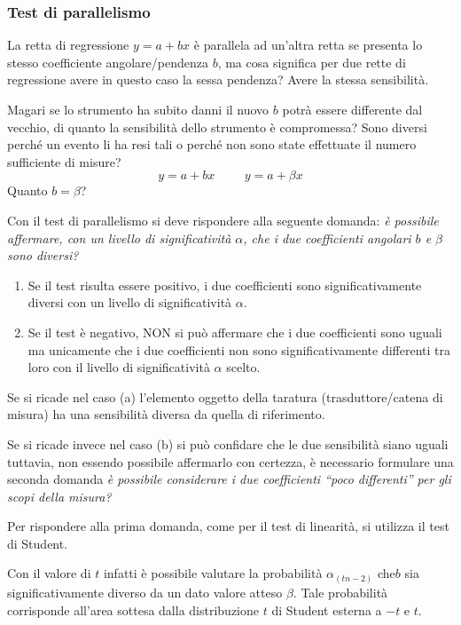 \documentclass[a4paper, 15pt]{article}
\begin{document}
\subsubsection{Test di parallelismo}
\begin{adjustwidth}{2in}{}		
	La retta di regressione $y = a +bx$ è parallela ad un'altra retta se presenta lo stesso coefficiente angolare/pendenza $b$, ma cosa significa per due rette di regressione avere in questo caso la sessa pendenza? Avere la stessa sensibilità.\newline  
	
	Magari se lo strumento ha subito danni il nuovo $b$ potrà essere differente dal vecchio, di quanto la sensibilità dello strumento è compromessa? Sono diversi perché un evento li ha resi tali o perché non sono state effettuate il numero sufficiente di misure? 	
	\[ y = a + bx \hspace{1cm} y = a + \beta x\]
	Quanto $b=\beta$?\newline 
	
	Con il test di parallelismo si deve rispondere alla seguente domanda:\textit{ è possibile affermare, con un livello di significatività $\alpha$, che i due coefficienti angolari
	$ b $ e $\beta$ sono diversi?}
	\begin{enumerate}[label=(\alph*)]
		\item Se il test risulta essere positivo, i due coefficienti sono significativamente
		diversi con un livello di significatività $\alpha$.
		\item Se il test è negativo, NON si può affermare che i due coefficienti sono uguali
		ma unicamente che i due coefficienti non sono significativamente differenti tra
		loro con il livello di significatività $\alpha$ scelto.
	\end{enumerate}
	Se si ricade nel caso (a) l’elemento oggetto della taratura (trasduttore/catena di misura) ha una sensibilità diversa da quella di riferimento. 
	
	Se si ricade invece nel caso (b) si può confidare che le due sensibilità siano uguali tuttavia, non essendo possibile affermarlo con certezza, è
	necessario formulare una seconda domanda \textit{è possibile considerare i due coefficienti “poco differenti” per gli scopi della misura?} \newline
	
	Per rispondere alla prima domanda, come per il test di linearità, si utilizza il test di Student.
	
	Con il valore di $ t $ infatti è possibile valutare la probabilità $\alpha_{(tn-2)}$ che$  b $ sia
	significativamente diverso da un dato valore atteso $\beta$. Tale probabilità corrisponde all'area
	sottesa dalla distribuzione $ t $ di Student esterna a $ -t $ e $ t $.\newline
	

\end{adjustwidth}
\end{document}
